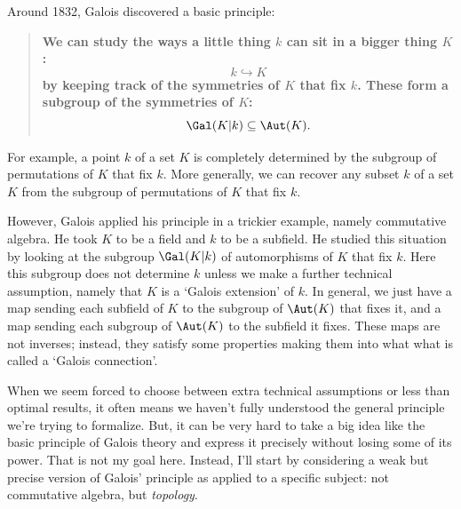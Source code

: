 \documentclass[12pt]{amsart}
\begin{document}
Around 1832, Galois discovered a basic principle:

\begin{quote}
\textbf{We can study the ways a little thing $k$ can sit 
in a bigger thing $K$:
\[               k \hookrightarrow K   \]
by keeping track of the symmetries of $K$ that fix $k$.
These form a subgroup of the symmetries of $K$:
\[             \Gal(K|k) \subseteq \Aut(K).   \]
}
\end{quote}
For example, a point $k$ of a set $K$ is completely determined by the
subgroup of permutations of $K$ that fix $k$.  More generally, we
can recover any subset $k$ of a set $K$ from the subgroup of permutations 
of $K$ that fix $k$.

However, Galois applied his principle in a trickier example, namely
commutative algebra.  He took $K$ to be a field and $k$ to be a
subfield.  He studied this situation by looking at the subgroup
$\Gal(K|k)$ of automorphisms of $K$ that fix $k$.  Here this subgroup
does not determine $k$ unless we make a further technical assumption,
namely that $K$ is a `Galois extension' of $k$.  In general, we just
have a map sending each subfield of $K$ to the subgroup of $\Aut(K)$ that
fixes it, and a map sending each subgroup of $\Aut(K)$ to the subfield
it fixes.  These maps are not inverses; instead, they satisfy some
properties making them into what what is called a `Galois connection'.

When we seem forced to choose between extra technical assumptions or
less than optimal results, it often means we haven't fully understood the
general principle we're trying to formalize.  But, it can be very hard to 
take a big idea like the basic principle of Galois theory and express 
it precisely without losing some of its power.  That is not my goal
here.  Instead, I'll start by considering a weak but precise version 
of Galois' principle as applied to a specific subject: not commutative 
algebra, but {\it topology}.  
\end{document}
